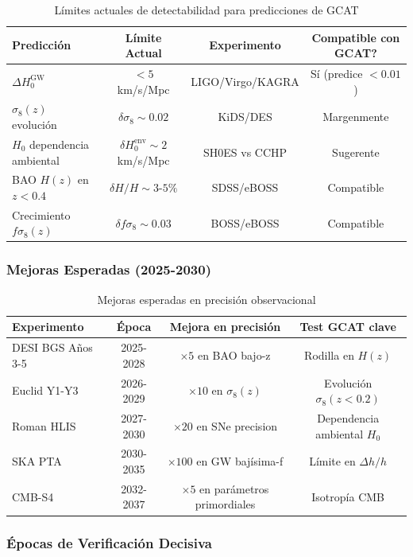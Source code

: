 \documentclass[12pt, a4paper]{article}
\theoremstyle{plain}
\theoremstyle{definition}
\begin{document}
\begin{table}[h]
\centering
\caption{Límites actuales de detectabilidad para predicciones de GCAT}
\label{tab:current_limits}
\begin{tabular}{lccc}
\toprule
\textbf{Predicción} & \textbf{Límite Actual} & \textbf{Experimento} & \textbf{Compatible con GCAT?} \\
\midrule
$\Delta H_0^{\mathrm{GW}}$ & $< 5$ km/s/Mpc & LIGO/Virgo/KAGRA & Sí (predice $< 0.01$) \\
$\sigma_8(z)$ evolución & $\delta\sigma_8 \sim 0.02$ & KiDS/DES & Margenmente \\
$H_0$ dependencia ambiental & $\delta H_0^{\mathrm{env}} \sim 2$ km/s/Mpc & SH0ES vs CCHP & Sugerente \\
BAO $H(z)$ en $z<0.4$ & $\delta H/H \sim 3$-$5\%$ & SDSS/eBOSS & Compatible \\
Crecimiento $f\sigma_8(z)$ & $\delta f\sigma_8 \sim 0.03$ & BOSS/eBOSS & Compatible \\
\bottomrule
\end{tabular}
\end{table}

\subsubsection{Mejoras Esperadas (2025-2030)}

\begin{table}[h]
\centering
\caption{Mejoras esperadas en precisión observacional}
\label{tab:future_improvements}
\begin{tabular}{lccc}
\toprule
\textbf{Experimento} & \textbf{Época} & \textbf{Mejora en precisión} & \textbf{Test GCAT clave} \\
\midrule
DESI BGS Años 3-5 & 2025-2028 & $\times 5$ en BAO bajo-z & Rodilla en $H(z)$ \\
Euclid Y1-Y3 & 2026-2029 & $\times 10$ en $\sigma_8(z)$ & Evolución $\sigma_8(z<0.2)$ \\
Roman HLIS & 2027-2030 & $\times 20$ en SNe precision & Dependencia ambiental $H_0$ \\
SKA PTA & 2030-2035 & $\times 100$ en GW bajísima-f & Límite en $\Delta h/h$ \\
CMB-S4 & 2032-2037 & $\times 5$ en parámetros primordiales & Isotropía CMB \\
\bottomrule
\end{tabular}
\end{table}

\subsubsection{Épocas de Verificación Decisiva}
\end{document}
